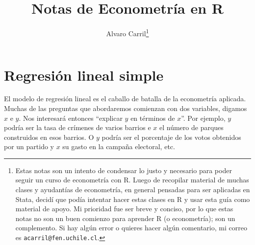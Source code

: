 \documentclass{report}\usepackage[]{graphicx}\usepackage[]{color}
\title{Notas de Econometría en R}
\author{Alvaro Carril\thanks{Estas notas son un intento de condensar lo justo y necesario para poder seguir un curso de econometría con R.
Luego de recopilar material de muchas clases y ayudantías de econometría, en general pensadas para ser aplicadas en Stata, decidí que podía intentar hacer estas clases en R y usar esta guía como material de apoyo.
Mi prioridad fue ser breve y conciso, por lo que estas notas no son un buen comienzo para aprender R (o econometría); son un complemento.
Si hay algún error o quieres hacer algún comentario, mi correo es \texttt{acarril@fen.uchile.cl}.}}
\begin{document}
\maketitle
\tableofcontents

\clearpage





\chapter{Regresión lineal simple}



El modelo de regresión lineal es el caballo de batalla de la econometría aplicada.
Muchas de las preguntas que abordaremos comienzan con dos variables, digamos $x$ e $y$. Nos interesará entonces ``explicar $y$ en términos de $x$''.
Por ejemplo, $y$ podría ser la tasa de crímenes de varios barrios e $x$ el número de parques construidos en esos barrios.
O $y$ podría ser el porcentaje de los votos obtenidos por un partido y $x$ su gasto en la campaña electoral, etc.
\end{document}
